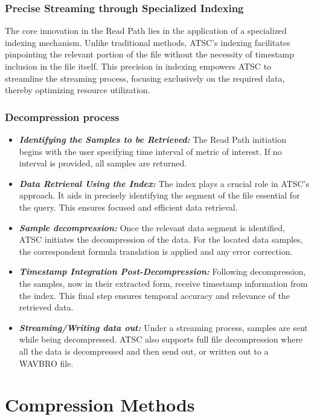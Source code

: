 \documentclass[conference]{IEEEtran}
\begin{document}
\subsubsection{Precise Streaming through Specialized Indexing}\label{SCMA}
The core innovation in the Read Path lies in the application of a specialized indexing mechanism. Unlike traditional methods, ATSC's indexing facilitates pinpointing the relevant portion of the file without the necessity of timestamp inclusion in the file itself. This precision in indexing empowers ATSC to streamline the streaming process, focusing exclusively on the required data, thereby optimizing resource utilization. 

\subsubsection{Decompression process}

\begin{itemize}
\item{\textbf{\textit{Identifying the Samples to be Retrieved:}}} The Read Path initiation begins with the user specifying time interval of metric of interest. If no interval is provided, all samples are returned.
\item{\textbf{\textit{Data Retrieval Using the Index:}}} The index plays a crucial role in ATSC's approach. It aids in precisely identifying the segment of the file essential for the query. This ensures focused and efficient data retrieval.
\item{\textbf{\textit{Sample decompression:}}} Once the relevant data segment is identified, ATSC initiates the decompression of the data.
For the located data samples, the correspondent formula translation is applied and any error correction.
\item{\textbf{\textit{Timestamp Integration Post-Decompression:}}} Following decompression, the samples, now in their extracted form, receive timestamp information from the index. This final step ensures temporal accuracy and relevance of the retrieved data.
\item{\textbf{\textit{Streaming/Writing data out:}}} Under a streaming process, samples are sent while being decompressed. ATSC also supports full file decompression where all the data is decompressed and then send out, or written out to a WAVBRO file.
\end{itemize}

\section{Compression Methods}\label{section:compression}
\end{document}
